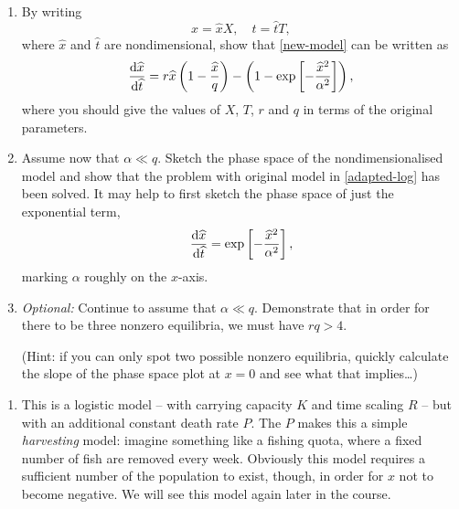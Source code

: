 \documentclass[a4paper,12pt]{article}
\begin{document}
\begin{enumerate}
{\begin{enumerate}[resume]
        \item By writing
          \begin{equation}
            x = \hat{x}X, \quad t = \hat{t}T,
          \end{equation}
          where $\hat{x}$ and $\hat{t}$ are nondimensional, show that \cref{new-model} can be written as
          \begin{equation}
            \fd{\hat{x}}{\hat{t}} = r\hat{x}\left(1-\frac{\hat{x}}{q}\right) - \left(1-\exp\left[-\frac{\hat{x}^2}{\alpha^2}\right]\right),
          \end{equation}
          where you should give the values of $X$, $T$, $r$ and $q$ in terms of the original parameters.

        \item Assume now that $\alpha \ll q$. Sketch the phase space of the nondimensionalised model and show that the problem with original model in \cref{adapted-log} has been solved. It may help to first sketch the phase space of just the exponential term,
          \begin{equation}
            \fd{\hat{x}}{\hat{t}} = \exp\left[-\frac{\hat{x}^2}{\alpha^2}\right],
          \end{equation}
          marking $\alpha$ roughly on the $x$-axis.

        \item \emph{Optional:} Continue to assume that $\alpha \ll q$. Demonstrate that in order for there to be three nonzero equilibria, we must have $rq>4$.

          (Hint: if you can only spot two possible nonzero equilibria, quickly calculate the slope of the phase space plot at $x=0$ and see what that implies\dots)

      \end{enumerate}
    }
    { %
      \begin{enumerate}
        \item This is a logistic model -- with carrying capacity $K$ and time scaling $R$ -- but with an additional constant death rate $P$. The $P$ makes this a simple \emph{harvesting} model: imagine something like a fishing quota, where a fixed number of fish are removed every week. Obviously this model requires a sufficient number of the population to exist, though, in order for $x$ not to become negative. We will see this model again later in the course.
\end{enumerate}}
\end{enumerate}
\end{document}
